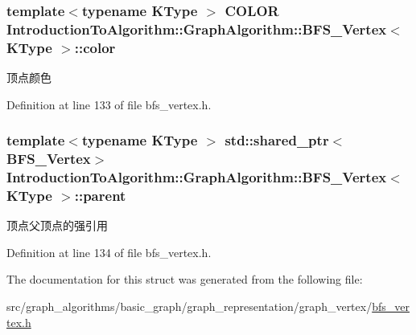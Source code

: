 \subsubsection[{color}]{\setlength{\rightskip}{0pt plus 5cm}template$<$typename K\+Type $>$ {\bf C\+O\+L\+O\+R} {\bf Introduction\+To\+Algorithm\+::\+Graph\+Algorithm\+::\+B\+F\+S\+\_\+\+Vertex}$<$ K\+Type $>$\+::color}\label{struct_introduction_to_algorithm_1_1_graph_algorithm_1_1_b_f_s___vertex_a7ab527ab8514bcb65e56edbe62b28fbb}
顶点颜色 

Definition at line 133 of file bfs\+\_\+vertex.\+h.

\hypertarget{struct_introduction_to_algorithm_1_1_graph_algorithm_1_1_b_f_s___vertex_a11202710469656d7fb04635430355c41}{}
\subsubsection[{parent}]{\setlength{\rightskip}{0pt plus 5cm}template$<$typename K\+Type $>$ std\+::shared\+\_\+ptr$<${\bf B\+F\+S\+\_\+\+Vertex}$>$ {\bf Introduction\+To\+Algorithm\+::\+Graph\+Algorithm\+::\+B\+F\+S\+\_\+\+Vertex}$<$ K\+Type $>$\+::parent}\label{struct_introduction_to_algorithm_1_1_graph_algorithm_1_1_b_f_s___vertex_a11202710469656d7fb04635430355c41}
顶点父顶点的强引用 

Definition at line 134 of file bfs\+\_\+vertex.\+h.



The documentation for this struct was generated from the following file\+:\begin{DoxyCompactItemize}
\item 
src/graph\+\_\+algorithms/basic\+\_\+graph/graph\+\_\+representation/graph\+\_\+vertex/\hyperlink{bfs__vertex_8h}{bfs\+\_\+vertex.\+h}\end{DoxyCompactItemize}
